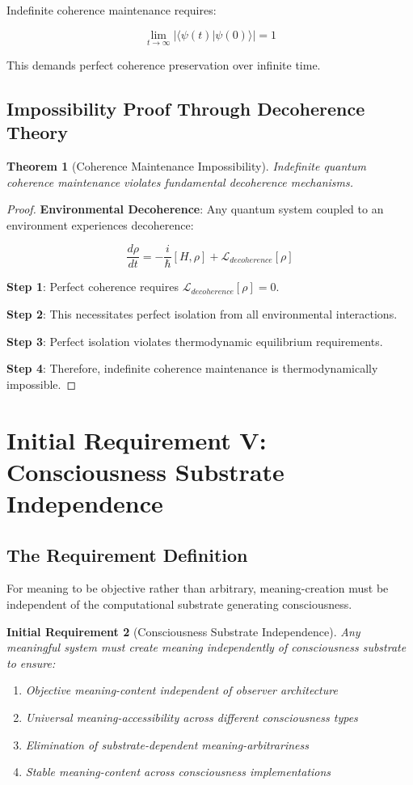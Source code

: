\documentclass[12pt,a4paper]{article}
\newtheorem{theorem}{Theorem}[section]
\newtheorem{requirement}[theorem]{Initial Requirement}
\begin{document}
Indefinite coherence maintenance requires:

$$\lim_{t \to \infty} |\langle\psi(t)|\psi(0)\rangle| = 1$$

This demands perfect coherence preservation over infinite time.

\subsection{Impossibility Proof Through Decoherence Theory}

\begin{theorem}[Coherence Maintenance Impossibility]
Indefinite quantum coherence maintenance violates fundamental decoherence mechanisms.
\end{theorem}

\begin{proof}
\textbf{Environmental Decoherence}: Any quantum system coupled to an environment experiences decoherence:

$$\frac{d\rho}{dt} = -\frac{i}{\hbar}[H,\rho] + \mathcal{L}_{decoherence}[\rho]$$

\textbf{Step 1}: Perfect coherence requires $\mathcal{L}_{decoherence}[\rho] = 0$.

\textbf{Step 2}: This necessitates perfect isolation from all environmental interactions.

\textbf{Step 3}: Perfect isolation violates thermodynamic equilibrium requirements.

\textbf{Step 4}: Therefore, indefinite coherence maintenance is thermodynamically impossible.
\end{proof}

\section{Initial Requirement V: Consciousness Substrate Independence}

\subsection{The Requirement Definition}

For meaning to be objective rather than arbitrary, meaning-creation must be independent of the computational substrate generating consciousness.

\begin{requirement}[Consciousness Substrate Independence]
Any meaningful system must create meaning independently of consciousness substrate to ensure:
\begin{enumerate}
\item Objective meaning-content independent of observer architecture
\item Universal meaning-accessibility across different consciousness types
\item Elimination of substrate-dependent meaning-arbitrariness
\item Stable meaning-content across consciousness implementations
\end{enumerate}
\end{requirement}
\end{document}
